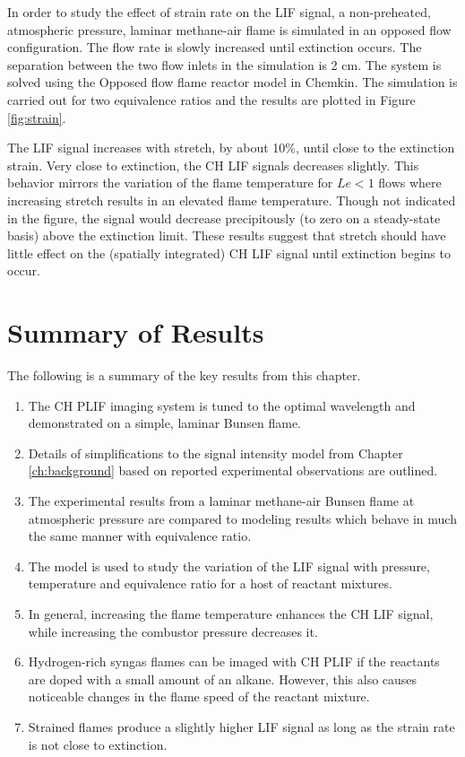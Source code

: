 In order to study the effect of strain rate on the LIF signal, a non-preheated, atmospheric pressure, laminar methane-air flame is simulated in an opposed flow configuration.
The flow rate is slowly increased until extinction occurs.
The separation between the two flow inlets in the simulation is 2 cm.
The system is solved using the Opposed flow flame reactor model in Chemkin.
The simulation is carried out for two equivalence ratios and the results are plotted in Figure \ref{fig:strain}.




The LIF signal increases with stretch, by about 10\%, until close to the extinction strain.
Very close to extinction, the CH LIF signals decreases slightly.
This behavior mirrors the variation of the flame temperature for \(Le<1\) flows where increasing stretch results in an elevated flame temperature.
Though not indicated in the figure, the signal would decrease precipitously (to zero on a steady-state basis) above the extinction limit.
These results suggest that stretch should have little effect on the (spatially integrated) CH LIF signal until extinction begins to occur.


\section{Summary of Results}

The following is a summary of the key results from this chapter.

\begin{enumerate}
  \item The CH PLIF imaging system is tuned to the optimal wavelength and demonstrated on a simple, laminar Bunsen flame.
  \item Details of simplifications to the signal intensity model from Chapter \ref{ch:background} based on reported experimental observations are outlined.
  \item The experimental results from a laminar methane-air Bunsen flame at atmospheric pressure are compared to modeling results which behave in much the same manner with equivalence ratio.
  \item The model is used to study the variation of the LIF signal with pressure, temperature and equivalence ratio for a host of reactant mixtures.
  \item In general, increasing the flame temperature enhances the CH LIF signal, while increasing the combustor pressure decreases it.
  \item Hydrogen-rich syngas flames can be imaged with CH PLIF if the reactants are doped with a small amount of an alkane.
    However, this also causes noticeable changes in the flame speed of the reactant mixture.
  \item Strained flames produce a slightly higher LIF signal as long as the strain rate is not close to extinction.
\end{enumerate}

